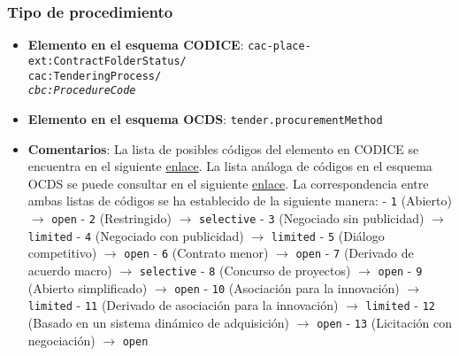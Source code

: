         \subsubsection{Tipo de procedimiento}
        \begin{itemize}
            \item \textbf{Elemento en el esquema CODICE}:
                \tabto{7.6cm} \texttt{cac-place-ext:ContractFolderStatus/} \\
                \tabto{7.6cm} \texttt{cac:TenderingProcess/} \\
                \tabto{7.6cm} \texttt{\textit{cbc:ProcedureCode}}
            \item \textbf{Elemento en el esquema OCDS}:
                \tabto{7.6cm} \texttt{tender.procurementMethod}
            \item \textbf{Comentarios}: La lista de posibles códigos del elemento en CODICE se encuentra en el siguiente 
                \href{https://contrataciondelestado.es/codice/cl/2.07/SyndicationTenderingProcessCode-2.07.gc}{enlace}.
                La lista análoga de códigos en el esquema OCDS se puede consultar en el siguiente
                \href{https://standard.open-contracting.org/latest/es/schema/codelists/#method}{enlace}.
                La correspondencia entre ambas listas de códigos se ha establecido de la siguiente manera:
                    \subitem - \texttt{1} (Abierto) $\rightarrow$ \texttt{open}
                    \subitem - \texttt{2} (Restringido) $\rightarrow$ \texttt{selective}
                    \subitem - \texttt{3} (Negociado sin publicidad) $\rightarrow$ \texttt{limited}
                    \subitem - \texttt{4} (Negociado con publicidad) $\rightarrow$ \texttt{limited}
                    \subitem - \texttt{5} (Diálogo competitivo) $\rightarrow$ \texttt{open}
                    \subitem - \texttt{6} (Contrato menor) $\rightarrow$ \texttt{open}
                    \subitem - \texttt{7} (Derivado de acuerdo macro) $\rightarrow$ \texttt{selective}
                    \subitem - \texttt{8} (Concurso de proyectos) $\rightarrow$ \texttt{open}
                    \subitem - \texttt{9} (Abierto simplificado) $\rightarrow$ \texttt{open}
                    \subitem - \texttt{10} (Asociación para la innovación) $\rightarrow$ \texttt{limited}
                    \subitem - \texttt{11} (Derivado de asociación para la innovación) $\rightarrow$ \texttt{limited}
                    \subitem - \texttt{12} (Basado en un sistema dinámico de adquisición) $\rightarrow$ \texttt{open}
                    \subitem - \texttt{13} (Licitación con negociación) $\rightarrow$ \texttt{open}

\end{itemize}
